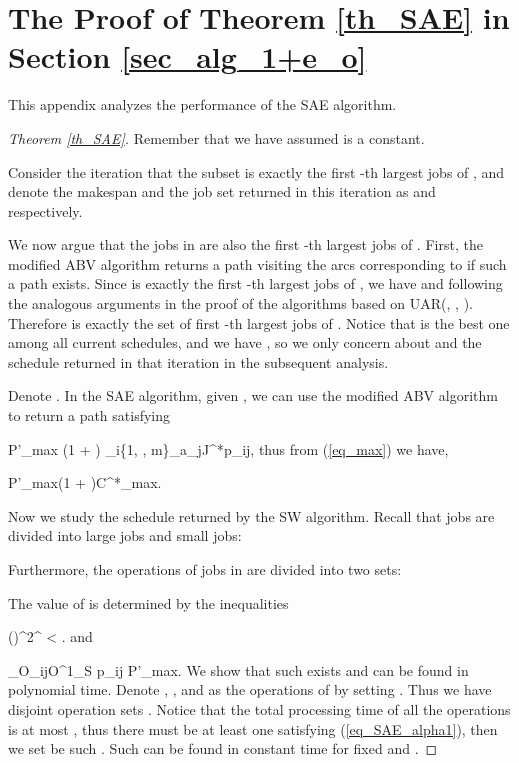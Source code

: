 \documentclass{llncs}
\newcommand{\be}{}
\numberwithin{subcase}{case}
\begin{document}
\section{The Proof of Theorem \ref{th_SAE} in Section \ref{sec_alg_1+e_o}}\label{app_SAE_proof}
This appendix analyzes the performance of the SAE algorithm.
\begin{proof}[Theorem \ref{th_SAE}]
Remember that we have assumed  is a constant.

Consider the iteration that the subset  is exactly the first -th largest jobs of , and denote the makespan and the job set returned in this iteration as  and  respectively.

We now argue that the jobs in  are also the first -th largest jobs of . First, the modified ABV algorithm returns a path visiting the arcs corresponding to  if such a path exists. Since  is exactly the first -th largest jobs of , we have  and  following the analogous arguments in the proof of the algorithms based on UAR(, , ). Therefore  is exactly the set of first -th largest jobs of . Notice that  is the best one among all current schedules, and we have , so we only concern about  and the schedule returned in that iteration in the subsequent analysis.

Denote . In the SAE algorithm, given , we can use the modified ABV algorithm to return a path satisfying
\be
P'_{max} \leq \left(1 + \right) \max_{i\in \{1, \cdots, m\}}\sum_{a_j\in J^*}p_{ij},
\ee
thus from (\ref{eq_max}) we have,
\be
P'_{max}\leq \left(1 + \right)C^*_{max}. \label{eq_SAE_abv}
\ee

Now we study the schedule returned by the SW algorithm. Recall that jobs are divided into large jobs and small jobs\cite{Sevastianov1998}:

Furthermore, the operations of jobs in  are divided into two sets:


The value of  is determined by the inequalities
\be
\left(\right)^{2^{}} < \alpha \leq {}. \label{eq_SAE_alpha2}
\ee
and
\be
\sum_{O_{ij}\in O^1_S} p_{ij} \leq {} P'_{max}. \label{eq_SAE_alpha1}
\ee
We show that such  exists and can be found in polynomial time. Denote , , and  as the operations of  by setting . Thus we have  disjoint operation sets . Notice that the total processing time of all the operations is at most , thus there must be at least one  satisfying (\ref{eq_SAE_alpha1}), then we set  be such . Such  can be found in constant time for fixed  and .


\end{proof}
\end{document}
